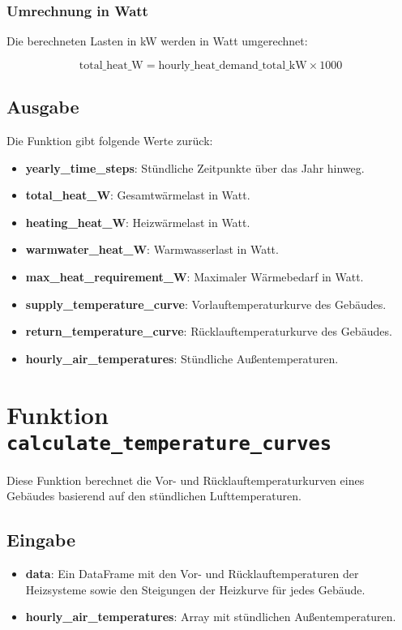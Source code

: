 \documentclass[a4paper,12pt]{article}
\begin{document}
\subsubsection{Umrechnung in Watt}
Die berechneten Lasten in kW werden in Watt umgerechnet:

\[
\text{total\_heat\_W} = \text{hourly\_heat\_demand\_total\_kW} \times 1000
\]

\subsection{Ausgabe}
Die Funktion gibt folgende Werte zurück:
\begin{itemize}
    \item \textbf{yearly\_time\_steps}: Stündliche Zeitpunkte über das Jahr hinweg.
    \item \textbf{total\_heat\_W}: Gesamtwärmelast in Watt.
    \item \textbf{heating\_heat\_W}: Heizwärmelast in Watt.
    \item \textbf{warmwater\_heat\_W}: Warmwasserlast in Watt.
    \item \textbf{max\_heat\_requirement\_W}: Maximaler Wärmebedarf in Watt.
    \item \textbf{supply\_temperature\_curve}: Vorlauftemperaturkurve des Gebäudes.
    \item \textbf{return\_temperature\_curve}: Rücklauftemperaturkurve des Gebäudes.
    \item \textbf{hourly\_air\_temperatures}: Stündliche Außentemperaturen.
\end{itemize}

\section{Funktion \texttt{calculate\_temperature\_curves}}

Diese Funktion berechnet die Vor- und Rücklauftemperaturkurven eines Gebäudes basierend auf den stündlichen Lufttemperaturen.

\subsection{Eingabe}
\begin{itemize}
    \item \textbf{data}: Ein DataFrame mit den Vor- und Rücklauftemperaturen der Heizsysteme sowie den Steigungen der Heizkurve für jedes Gebäude.
    \item \textbf{hourly\_air\_temperatures}: Array mit stündlichen Außentemperaturen.
\end{itemize}
\end{document}

